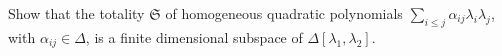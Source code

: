 Show that the totality $\mathfrak{S}$ of homogeneous quadratic polynomials $\sum_{i \leq j} \alpha_{ij} \lambda_i \lambda_j$, with $\alpha_{ij} \in \Delta$, is a finite dimensional subspace of $\Delta[\lambda_1, \lambda_2]$.
